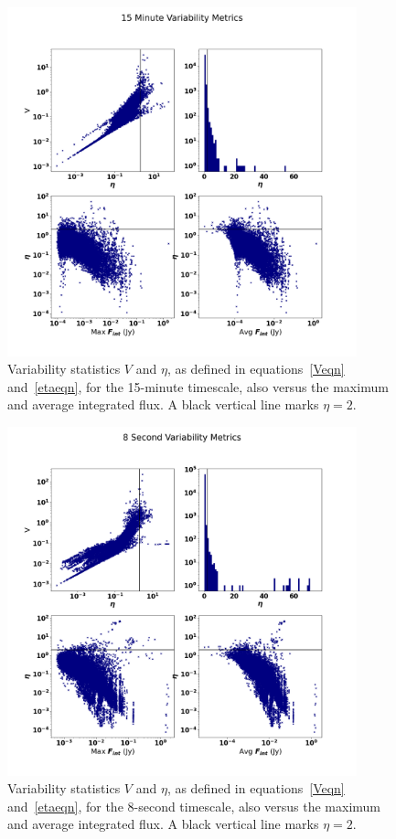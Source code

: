\documentclass[12pt]{article}
\begin{document}
\begin{figure}
	\includegraphics[width=0.9\textwidth]{15_Minute_Variability_Metrics.png}
	\caption{Variability statistics $V$ and $\eta$, as defined in equations~\ref{Veqn} and~\ref{etaeqn}, for the 15-minute timescale, also versus the maximum and average integrated flux. A black vertical line marks $\eta=2$.}
	\label{fig:varstat15min}
\end{figure}

\begin{figure}
	\includegraphics[width=0.9\textwidth]{8_Second_Variability_Metrics.png}
	\caption{Variability statistics $V$ and $\eta$, as defined in equations~\ref{Veqn} and~\ref{etaeqn}, for the 8-second timescale, also versus the maximum and average integrated flux. A black vertical line marks $\eta=2$.}
	\label{fig:varstat8sec}
\end{figure}
\end{document}

